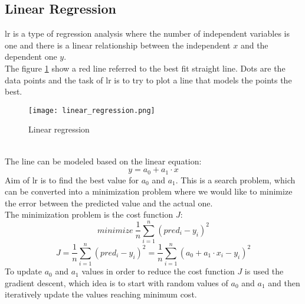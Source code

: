 \subsection{Linear Regression}
\gls{lr} is a type of regression analysis where the number of independent variables is one and there is a linear relationship between the independent $x$ and the dependent one $y$.
\\
The figure \ref{fig:linear_regression} show a red line referred to the best fit straight line. Dots are the data points and the task of \gls{lr} is to try to plot a line that models the points the best.
\begin{figure}[h]
    \centering
    \texttt{[image: linear\_regression.png]} 
	\caption{Linear regression}
    \label{fig:linear_regression}
\end{figure} 
\\
The line can be modeled based on the linear equation:
\begin{equation}
	y=a_0+a_1\cdot x
\end{equation}
Aim of \gls{lr} is to find the best value for $a_0$ and $a_1$. This is a search problem, which can be converted into a minimization problem where we would like to minimize the error between the predicted value and the actual one.
\\
The minimization problem is the cost function $J$:
\begin{equation}
	minimize \: \dfrac{1}{n} \sum_{i=1}^n{{(pred_i-y_i)}^2}
\end{equation}
\begin{equation}
	J=\dfrac{1}{n} \sum_{i=1}^n{{(pred_i-y_i)}^2}=\dfrac{1}{n} \sum_{i=1}^n{{(a_0+a_1\cdot x_i-y_i)}^2}
\end{equation}
To update $a_0$ and $a_1$ values in order to reduce the cost function $J$ is used the gradient descent, which idea is to start with random values of $a_0$ and $a_1$ and then iteratively update the values reaching minimum cost.

